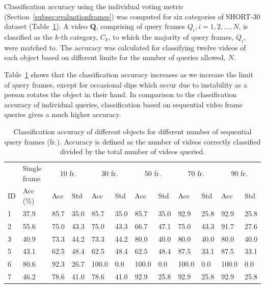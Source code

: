 Classification accuracy using the individual voting metric (Section~\ref{subsec:evaluationframes}) was computed for six categories of SHORT-30 dataset (Table~\ref{table:testData}). A video $\mathbf{Q}$, comprising of query frames $Q_i, i = 1,2,...,N$, is classified as the $k$-th category, $C_k$, to which the majority of query frames, $Q_i$, were matched to. The accuracy was calculated for classifying twelve videos of each object based on different limits for the number of queries allowed, $N$.

Table~\ref{table:testData} shows that the classification accuracy increases as we increase the limit of query frames, except for occasional dips which occur due to instability as a person rotates the object in their hand. In comparison to the classification accuracy of individual queries, classification based on sequential video frame queries gives a much higher accuracy.


\begin{table}
\centering
\begin{tabularx}{1.05\linewidth}{XXXXXXXXXXXX}
\toprule
 & Single frame & \multicolumn{2}{c}{10 fr.\right } & \multicolumn{2}{c}{30 fr.} & \multicolumn{2}{c}{50 fr.} & \multicolumn{2}{c}{70 fr.} & \multicolumn{2}{c}{90 fr.}\\
ID & Acc (\%) & Acc & Std & Acc & Std & Acc & Std & Acc & Std & Acc & Std \\
\midrule
1 & 37.9 & 85.7 & 35.0 & 85.7 & 35.0 & 85.7 & 35.0 & 92.9 & 25.8 & 92.9 & 25.8 \\
2 & 55.6 & 75.0 & 43.3 & 75.0 & 43.3 & 66.7 & 47.1 & 75.0 & 43.3 & 91.7 & 27.6\\
3 & 40.9 & 73.3 & 44.2 & 73.3 & 44.2 & 80.0 & 40.0 & 80.0 & 40.0 & 80.0 & 40.0\\
5 & 43.1 & 62.5 & 48.4 & 62.5 & 48.4 & 62.5 & 48.4 & 87.5 & 33.1  & 87.5 & 33.1\\
6 & 80.6 & 92.3 & 26.7 & 100.0 & 0.0 & 100.0 & 0.0 & 100.0 & 0.0  & 100.0 & 0.0\\
7 & 46.2 & 78.6 & 41.0 & 78.6 & 41.0 & 92.9 & 25.8 & 92.9 & 25.8  & 92.9 & 25.8\\
\bottomrule
\end{tabularx}
\caption{Classification accuracy of different objects for different number of sequential query frames (fr.). Accuracy is defined as the number of videos correctly classified divided by the total number of videos queried.}
\label{table:testData}
\end{table}





